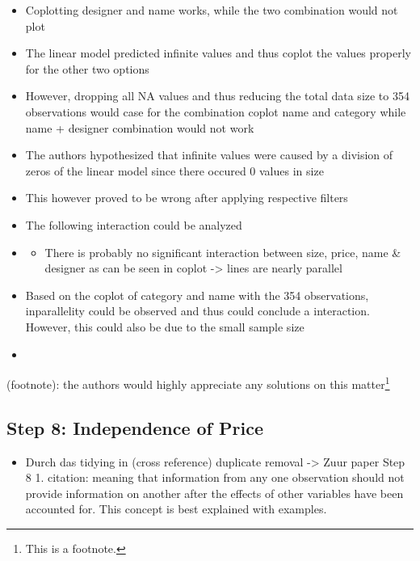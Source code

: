 \documentclass[a4paper, nobind]{templates/ociamthesis}
\providecommand{\tightlist}{%
  \setlength{\itemsep}{0pt}\setlength{\parskip}{0pt}}
\begin{document}
\begin{itemize}
\item
  Coplotting designer and name works, while the two combination would not plot
\item
  The linear model predicted infinite values and thus coplot the values properly for the other two options
\item
  However, dropping all NA values and thus reducing the total data size to 354 observations would case for the combination coplot name and category while name + designer combination would not work
\item
  The authors hypothesized that infinite values were caused by a division of zeros of the linear model since there occured 0 values in size
\item
  This however proved to be wrong after applying respective filters
\item
  The following interaction could be analyzed
\item
  \begin{itemize}
  \tightlist
  \item
    There is probably no significant interaction between size, price, name \& designer as can be seen in coplot -\textgreater{} lines are nearly parallel
  \end{itemize}
\item
  Based on the coplot of category and name with the 354 observations, inparallelity could be observed and thus could conclude a interaction. However, this could also be due to the small sample size
\item
\end{itemize}

(footnote): the authors would highly appreciate any solutions on this matter\footnote{This is a footnote.}

\hypertarget{step-8-independence-of-price}{%
\subsection{Step 8: Independence of Price}\label{step-8-independence-of-price}}

\begin{itemize}
\tightlist
\item
  Durch das tidying in (cross reference) duplicate removal -\textgreater{} Zuur paper Step 8 1. citation: meaning that information from any one observation should not provide information on another after the effects of other variables have been accounted for. This concept is best explained with examples.
\end{itemize}
\end{document}
